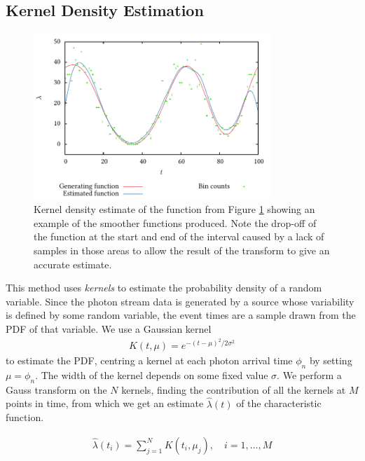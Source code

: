 \documentclass[a4paper,11pt]{article}
\begin{document}
\subsection{Kernel Density Estimation}
\label{sec-3-2}

    \begin{figure}[h]
    \centering
    \includegraphics[width=0.8\textwidth]{images/kde}

    \caption{Kernel density estimate of the function from Figure
    \ref{fig:basecomp} showing an example of the smoother functions
    produced. Note the drop-off of the function at the start and end of the
    interval caused by a lack of samples in those areas to allow the result of
    the transform to give an accurate estimate.}

    \label{fig:basecomp}
    \end{figure}

   This method uses \emph{kernels} to estimate the probability density of a
   random variable. Since the photon stream data is generated by a source whose
   variability is defined by some random variable, the event times are a sample
   drawn from the PDF of that variable. We use a Gaussian kernel
   \begin{align}
   K(t,\mu)=e^{-(t-\mu)^2/2\sigma^2}
   \end{align}
   to estimate the PDF, centring a kernel at each photon arrival time $\phi_n$ by
   setting $\mu=\phi_n$. The width of the kernel depends on some fixed value
   $\sigma$. We perform a Gauss transform on the $N$ kernels, finding the
   contribution of all the kernels at $M$ points in time, from which we get an
   estimate $\hat{\lambda}(t)$ of the characteristic function.

   \begin{align}
   \hat{\lambda}(t_i) = \sum_{j=1}^N K(t_i,\mu_j), \quad i=1,\dots,M
   \end{align}
\end{document}
